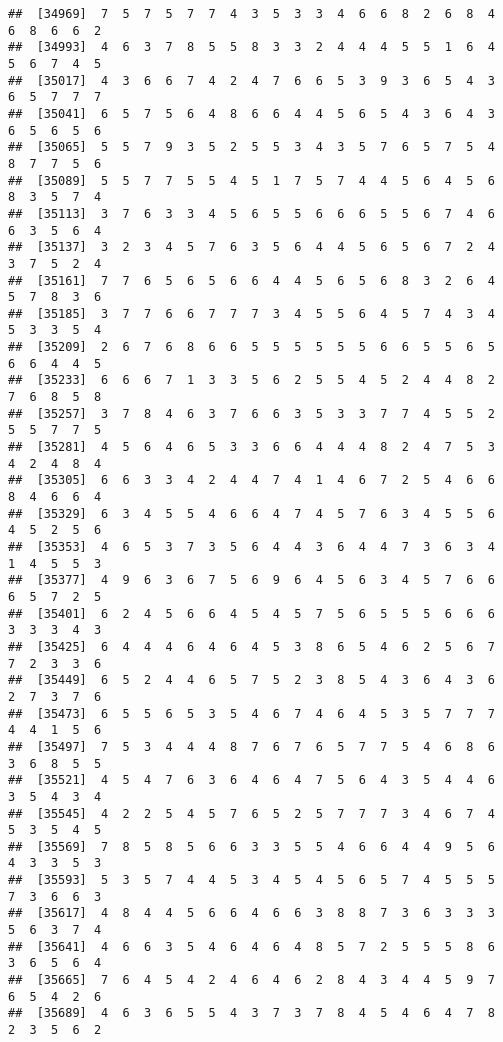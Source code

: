 \documentclass[
]{book}
\begin{document}
\begin{verbatim}
##  [34969]  7  5  7  5  7  7  4  3  5  3  3  4  6  6  8  2  6  8  4  6  8  6  6  2
##  [34993]  4  6  3  7  8  5  5  8  3  3  2  4  4  4  5  5  1  6  4  5  6  7  4  5
##  [35017]  4  3  6  6  7  4  2  4  7  6  6  5  3  9  3  6  5  4  3  6  5  7  7  7
##  [35041]  6  5  7  5  6  4  8  6  6  4  4  5  6  5  4  3  6  4  3  6  5  6  5  6
##  [35065]  5  5  7  9  3  5  2  5  5  3  4  3  5  7  6  5  7  5  4  8  7  7  5  6
##  [35089]  5  5  7  7  5  5  4  5  1  7  5  7  4  4  5  6  4  5  6  8  3  5  7  4
##  [35113]  3  7  6  3  3  4  5  6  5  5  6  6  6  5  5  6  7  4  6  6  3  5  6  4
##  [35137]  3  2  3  4  5  7  6  3  5  6  4  4  5  6  5  6  7  2  4  3  7  5  2  4
##  [35161]  7  7  6  5  6  5  6  6  4  4  5  6  5  6  8  3  2  6  4  5  7  8  3  6
##  [35185]  3  7  7  6  6  7  7  7  3  4  5  5  6  4  5  7  4  3  4  5  3  3  5  4
##  [35209]  2  6  7  6  8  6  6  5  5  5  5  5  5  6  6  5  5  6  5  6  6  4  4  5
##  [35233]  6  6  6  7  1  3  3  5  6  2  5  5  4  5  2  4  4  8  2  7  6  8  5  8
##  [35257]  3  7  8  4  6  3  7  6  6  3  5  3  3  7  7  4  5  5  2  5  5  7  7  5
##  [35281]  4  5  6  4  6  5  3  3  6  6  4  4  4  8  2  4  7  5  3  4  2  4  8  4
##  [35305]  6  6  3  3  4  2  4  4  7  4  1  4  6  7  2  5  4  6  6  8  4  6  6  4
##  [35329]  6  3  4  5  5  4  6  6  4  7  4  5  7  6  3  4  5  5  6  4  5  2  5  6
##  [35353]  4  6  5  3  7  3  5  6  4  4  3  6  4  4  7  3  6  3  4  1  4  5  5  3
##  [35377]  4  9  6  3  6  7  5  6  9  6  4  5  6  3  4  5  7  6  6  6  5  7  2  5
##  [35401]  6  2  4  5  6  6  4  5  4  5  7  5  6  5  5  5  6  6  6  3  3  3  4  3
##  [35425]  6  4  4  4  6  4  6  4  5  3  8  6  5  4  6  2  5  6  7  7  2  3  3  6
##  [35449]  6  5  2  4  4  6  5  7  5  2  3  8  5  4  3  6  4  3  6  2  7  3  7  6
##  [35473]  6  5  5  6  5  3  5  4  6  7  4  6  4  5  3  5  7  7  7  4  4  1  5  6
##  [35497]  7  5  3  4  4  4  8  7  6  7  6  5  7  7  5  4  6  8  6  3  6  8  5  5
##  [35521]  4  5  4  7  6  3  6  4  6  4  7  5  6  4  3  5  4  4  6  3  5  4  3  4
##  [35545]  4  2  2  5  4  5  7  6  5  2  5  7  7  7  3  4  6  7  4  5  3  5  4  5
##  [35569]  7  8  5  8  5  6  6  3  3  5  5  4  6  6  4  4  9  5  6  4  3  3  5  3
##  [35593]  5  3  5  7  4  4  5  3  4  5  4  5  6  5  7  4  5  5  5  7  3  6  6  3
##  [35617]  4  8  4  4  5  6  6  4  6  6  3  8  8  7  3  6  3  3  3  5  6  3  7  4
##  [35641]  4  6  6  3  5  4  6  4  6  4  8  5  7  2  5  5  5  8  6  3  6  5  6  4
##  [35665]  7  6  4  5  4  2  4  6  4  6  2  8  4  3  4  4  5  9  7  6  5  4  2  6
##  [35689]  4  6  3  6  5  5  4  3  7  3  7  8  4  5  4  6  4  7  8  2  3  5  6  2

\end{verbatim}
\end{document}
